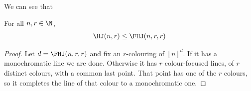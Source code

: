 We can see that
\begin{boxlemma} \label{Ch6:Lemma:HJ_le_FHJ}
    For all $n, r \in \N$,
    \begin{align*}
        \HJ(n, r) \le \FHJ(n, r, r)
    \end{align*}
\end{boxlemma}
\begin{proof}
    Let $d = \FHJ(n, r, r)$ and fix an $r$-colouring of $[n]^d$. If it has a monochromatic line we are done. Otherwise it has $r$ colour-focused lines, of $r$ distinct colours, with a common last point. That point has one of the $r$ colours, so it completes the line of that colour to a monochromatic one.
\end{proof}

